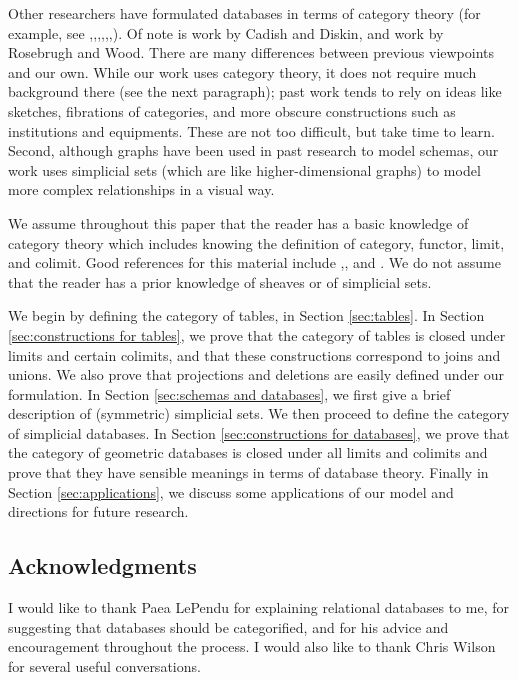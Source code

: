 \documentclass{amsart}
\begin{document}
Other researchers have formulated databases in terms of category theory (for example, see \cite{RW},\cite{JRW},\cite{PS},\cite{Ber},\cite{DK},\cite{Dis},\cite{GB}).  Of note is work by Cadish and Diskin, and work by Rosebrugh and Wood.  There are many differences between previous viewpoints and our own.  While our work uses category theory, it does not require much background there (see the next paragraph); past work tends to rely on ideas like sketches, fibrations of categories, and more obscure constructions such as institutions and equipments.  These are not too difficult, but take time to learn.  Second, although graphs have been used in past research to model schemas, our work uses simplicial sets (which are like higher-dimensional graphs) to model more complex relationships in a visual way.  

We assume throughout this paper that the reader has a basic knowledge of category theory which includes knowing the definition of category, functor, limit, and colimit.  Good references for this material include \cite{Mac},\cite{BW}, and \cite{Bor1}.  We do not assume that the reader has a prior knowledge of sheaves or of simplicial sets.

We begin by defining the category of tables, in Section \ref{sec:tables}.  In Section \ref{sec:constructions for tables}, we prove that the category of tables is closed under limits and certain colimits, and that these constructions correspond to joins and unions.  We also prove that projections and deletions are easily defined under our formulation.  In Section \ref{sec:schemas and databases}, we first give a brief description of (symmetric) simplicial sets.  We then proceed to define the category of simplicial databases.  In Section \ref{sec:constructions for databases}, we prove that the category of geometric databases is closed under all limits and colimits and prove that they have sensible meanings in terms of database theory.  Finally in Section \ref{sec:applications}, we discuss some applications of our model and directions for future research.

\subsection{Acknowledgments}

I would like to thank Paea LePendu for explaining relational databases to me, for suggesting that databases should be categorified, and for his advice and encouragement throughout the process.  I would also like to thank Chris Wilson for several useful conversations.
\end{document}
